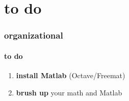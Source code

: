     \section{to do}
        \begin{frame}\frametitle{organizational}\framesubtitle{to do}
            \begin{enumerate}
            
                \smallskip
                \item<2->   \textbf{install Matlab} (Octave/Freemat)
            
                \smallskip
                \item<3->   \textbf{brush up} your math and Matlab
            
            \end{enumerate}
        \end{frame}



